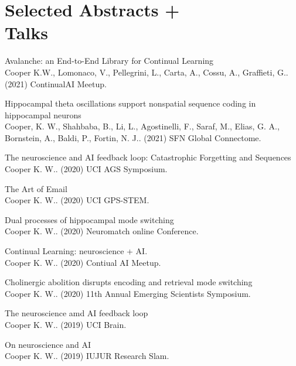 \documentclass[10pt]{cooperCV2}
\begin{document}
\section{Selected Abstracts +  \\Talks}

 
\begin{etaremune}[itemindent=-1.5\bibhang, topsep=0pt,
				   itemsep=\bibsep,partopsep=0pt,parsep=0pt,leftmargin={\bibhang+\widthof{[999]}}] 
    
    \item Avalanche: an End-to-End Library for Continual Learning\\ Cooper K.W., Lomonaco, V., Pellegrini, L., Carta, A., Cossu, A., Graffieti, G.. (2021) ContinualAI Meetup. 
     
	
    \item Hippocampal theta oscillations support nonspatial sequence coding in hippocampal neurons\\ Cooper, K. W., Shahbaba, B., Li, L., Agostinelli, F., Saraf, M., Elias, G. A., Bornstein, A., Baldi, P.,  Fortin, N. J.. (2021) SFN Global Connectome. 
     
	
    \item The neuroscience and AI feedback loop: Catastrophic Forgetting and Sequences\\ Cooper K. W.. (2020) UCI AGS Symposium. 
     
	
    \item The Art of Email\\ Cooper K. W.. (2020) UCI GPS-STEM. 
     
	
    \item Dual processes of hippocampal mode switching\\ Cooper K. W.. (2020) Neuromatch online Conference. 
     
	
    \item Continual Learning: neuroscience + AI.\\ Cooper K. W.. (2020) Contiual AI Meetup. 
     
	
    \item Cholinergic abolition disrupts encoding and retrieval mode switching\\ Cooper K. W.. (2020) 11th Annual Emerging Scientists Symposium. 
     
	
    \item The neuroscience amd AI feedback loop\\ Cooper K. W.. (2019) UCI Brain. 
     
	
    \item On neuroscience and AI\\ Cooper K. W.. (2019) IUJUR Research Slam. 
     

\end{etaremune}
\end{document}
